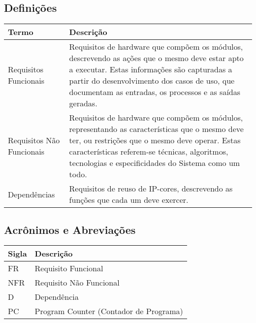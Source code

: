 \documentclass{article}
\begin{document}
  \subsection{Definições}
    \FloatBarrier
    \begin{table}[H]
      \begin{center}
        \begin{tabular}[pos]{|m{5cm} | m{9cm}|} 
          \hline
          \cellcolor[gray]{0.9}\textbf{Termo} & \cellcolor[gray]{0.9}\textbf{Descrição} \\ \hline
          Requisitos Funcionais & Requisitos de hardware que compõem os módulos, descrevendo as ações que o mesmo deve estar apto a executar. Estas informações são capturadas a partir do desenvolvimento dos casos de uso, que documentam as entradas, os processos e as saídas geradas.  \\ \hline
          Requisitos Não Funcionais & Requisitos de hardware que compõem os módulos, representando as características que o mesmo deve ter, ou restrições que o mesmo deve operar. Estas características referem-se técnicas, algoritmos, tecnologias e especificidades do Sistema como um todo.  \\ \hline
          Dependências & Requisitos de reuso de IP-cores, descrevendo as funções que cada um deve exercer. \\ \hline
        \end{tabular}
      \end{center}
    \end{table}  

  \subsection{Acrônimos e Abreviações}
    \FloatBarrier
    \begin{table}[H]
      \begin{center}
        \begin{tabular}[pos]{|m{2cm} | m{12cm}|} 
          \hline
          \cellcolor[gray]{0.9}\textbf{Sigla} & \cellcolor[gray]{0.9}\textbf{Descrição} \\ \hline
          FR      & Requisito Funcional  \\ \hline
          NFR     & Requisito Não Funcional  \\ \hline
          D       & Dependência  \\ \hline
          PC       & Program Counter (Contador de Programa)  \\ \hline
        \end{tabular}
      \end{center}
    \end{table}  
\end{document}
